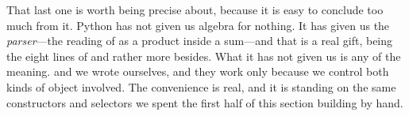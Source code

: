 \begin{revealTheSurface}
That last one is worth being precise about, because it is easy to conclude too
much from it.  Python has not given us algebra for nothing.  It has given us
the \emph{parser}---the reading of  as a product inside a
sum---and that is a real gift, being the eight lines of 
and rather more besides.  What it has not given us is any of the meaning.
 and  we wrote ourselves, and they work only
because we control both kinds of object involved.  The convenience is real, and
it is standing on the same constructors and selectors we spent the first half
of this section building by hand.
\end{revealTheSurface}
